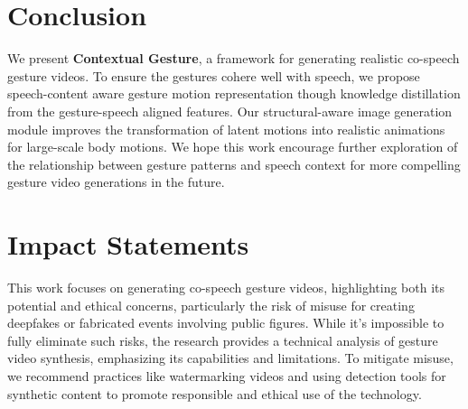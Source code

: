 \section{Conclusion}
\label{sec:conclusion}

\vspace{-0.2cm}

We present \textbf{Contextual Gesture}, a framework for generating realistic co-speech gesture videos.
To ensure the gestures cohere well with speech, we propose speech-content aware gesture motion representation though knowledge distillation from the gesture-speech aligned features.
%
Our structural-aware image generation module improves the transformation of latent motions into realistic animations for large-scale body motions.
%
We hope this work encourage further exploration of the relationship between gesture patterns and speech context for more compelling gesture video generations in the future.



\section{Impact Statements}
\vspace{-0.2cm}
This work focuses on generating co-speech gesture videos, highlighting both its potential and ethical concerns, particularly the risk of misuse for creating deepfakes or fabricated events involving public figures. While it’s impossible to fully eliminate such risks, the research provides a technical analysis of gesture video synthesis, emphasizing its capabilities and limitations. To mitigate misuse, we recommend practices like watermarking videos and using detection tools for synthetic content to promote responsible and ethical use of the technology.



